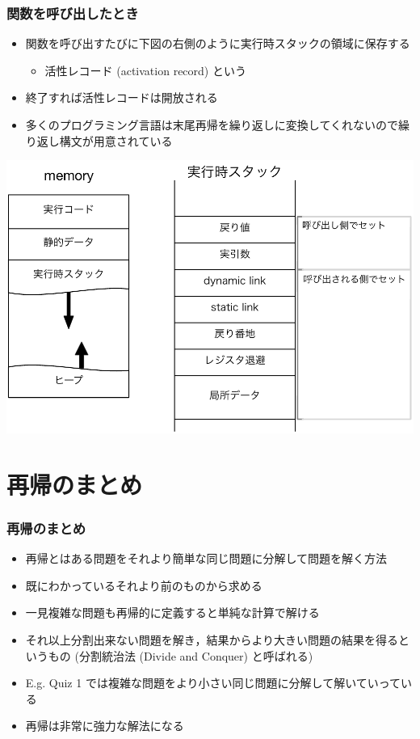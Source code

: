 \begin{frame}[shrink]
\frametitle{関数を呼び出したとき}
  \begin{itemize}
\item 関数を呼び出すたびに下図の右側のように実行時スタックの領域に保存する
    \begin{itemize}
\item 活性レコード (activation record) という
    \end{itemize}
\item 終了すれば活性レコードは開放される
\item 多くのプログラミング言語は末尾再帰を繰り返しに変換してくれないので繰り返し構文が用意されている
  \end{itemize}
  \begin{center}
\includegraphics[scale=0.3]{./Figure/elementaryCS-figMemory}
  \end{center}
\end{frame}
\section{再帰のまとめ}
\begin{frame}[fragile]
\frametitle{再帰のまとめ}
  \begin{itemize}
\item 再帰とはある問題をそれより簡単な同じ問題に分解して問題を解く方法
\item 既にわかっているそれより前のものから求める
\item 一見複雑な問題も再帰的に定義すると単純な計算で解ける
\item それ以上分割出来ない問題を解き，結果からより大きい問題の結果を得るというもの (分割統治法 (Divide and Conquer) と呼ばれる)
\item E.g. Quiz 1 では複雑な問題をより小さい同じ問題に分解して解いていっている
\item 再帰は非常に強力な解法になる
  \end{itemize}
\end{frame}

